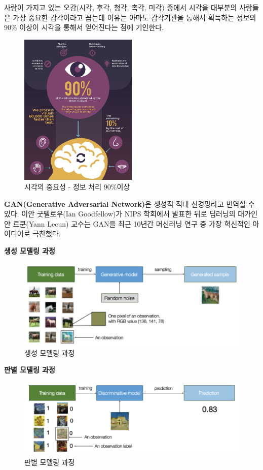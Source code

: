 \documentclass[smallextended]{svjour3}       %
\begin{document}
사람이 가지고 있는 오감(시각, 후각, 청각, 촉각, 미각) 중에서 시각을
대부분의 사람들은 가장 중요한 감각이라고 꼽는데 이유는 아마도 감각기관을
통해서 획득하는 정보의 90\% 이상이 시각을 통해서 얻어진다는 점에
기인한다.

\begin{figure}
\hypertarget{id}{%
\centering
\includegraphics[width=0.5\textwidth,height=\textheight]{fig/sensory-visual.png}
\caption{시각의 중요성 - 정보 처리 90\%이상}\label{id}
}
\end{figure}

\textbf{GAN(Generative Adversarial Network)}은 생성적 적대 신경망라고
번역할 수 있다. 이안 굿펠로우(Ian Goodfellow)가 NIPS 학회에서 발표한
뒤로 딥러닝의 대가인 얀 르쿤(Yann Lecun) 교수는 GAN을 최근 10년간
머신러닝 연구 중 가장 혁신적인 아이디어로 극찬했다.

\textbf{생성 모델링 과정}

\begin{figure}
\centering
\includegraphics{fig/generative-model.png}
\caption{생성 모델링 과정}
\end{figure}

\textbf{판별 모델링 과정}

\begin{figure}
\centering
\includegraphics{fig/discriminative-model.png}
\caption{판별 모델링 과정}
\end{figure}
\end{document}
